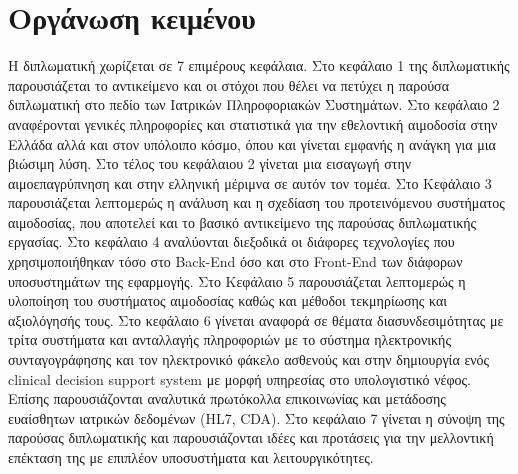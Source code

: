 \section{Οργάνωση κειμένου}
H διπλωματική χωρίζεται σε 7 επιμέρους κεφάλαια. Στο κεφάλαιο 1 της διπλωματικής παρουσιάζεται το αντικείμενο και οι στόχοι που θέλει να πετύχει η παρούσα διπλωματική στο πεδίο των Ιατρικών Πληροφοριακών Συστημάτων. Στο κεφάλαιο 2 αναφέρονται γενικές πληροφορίες και στατιστικά για την εθελοντική αιμοδοσία στην Ελλάδα αλλά και στον υπόλοιπο κόσμο, όπου και γίνεται εμφανής η ανάγκη για μια βιώσιμη λύση. Στο τέλος του κεφάλαιου 2 γίνεται μια εισαγωγή στην αιμοεπαγρύπνηση και στην ελληνική μέριμνα σε αυτόν τον τομέα. Στο Κεφάλαιο 3 παρουσιάζεται λεπτομερώς η ανάλυση και η σχεδίαση του προτεινόμενου συστήματος αιμοδοσίας, που αποτελεί και το βασικό αντικείμενο της παρούσας διπλωματικής εργασίας. Στο κεφάλαιο 4 αναλύονται διεξοδικά οι διάφορες τεχνολογίες που χρησιμοποιήθηκαν τόσο στο Back-End όσο και στο Front-End των διάφορων υποσυστημάτων της εφαρμογής. Στο Κεφάλαιο 5 παρουσιάζεται λεπτομερώς η υλοποίηση του συστήματος αιμοδοσίας καθώς και μέθοδοι τεκμηρίωσης και αξιολόγησής τους. Στο κεφάλαιο 6 γίνεται αναφορά σε θέματα διασυνδεσιμότητας με τρίτα συστήματα και ανταλλαγής πληροφοριών με το σύστημα ηλεκτρονικής συνταγογράφησης και τον ηλεκτρονικό φάκελο ασθενούς και στην δημιουργία ενός clinical decision support system με μορφή υπηρεσίας στο υπολογιστικό νέφος. Επίσης παρουσιάζονται αναλυτικά πρωτόκολλα επικοινωνίας και μετάδοσης ευαίσθητων ιατρικών δεδομένων (HL7, CDA). Στο κεφάλαιο 7 γίνεται η σύνοψη της παρούσας διπλωματικής και παρουσιάζονται ιδέες και προτάσεις για την μελλοντική επέκταση της με επιπλέον υποσυστήματα και λειτουργικότητες.